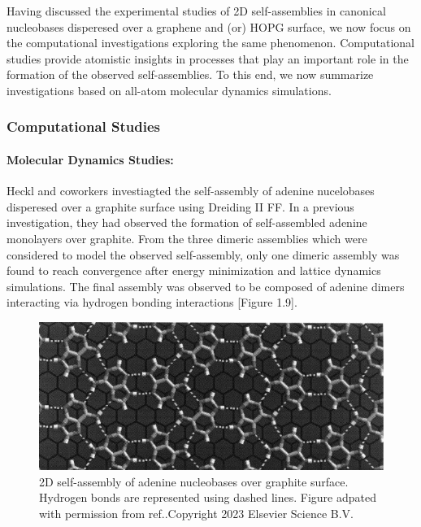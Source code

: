 Having discussed the experimental studies of 2D self-assemblies in canonical nucleobases disperesed over a graphene and (or) HOPG surface, we now focus on the computational investigations exploring the same phenomenon. Computational studies provide atomistic insights in processes that play an important role in the formation of the observed self-assemblies. To this end, we now summarize investigations based on all-atom molecular dynamics simulations.

\subsubsection{Computational Studies}
\paragraph{Molecular Dynamics Studies:} Heckl and coworkers investiagted the self-assembly of adenine nucelobases disperesed over a graphite surface using Dreiding II FF.\supercite{edelwirth_molecular_1998} In a previous investigation, they had observed the formation of self-assembled adenine monolayers over graphite.\supercite{freund_structure_1997} From the three dimeric assemblies which were considered to model the observed self-assembly, only one dimeric assembly was found to reach convergence after energy minimization and lattice dynamics simulations. The final assembly was observed to be composed of adenine dimers interacting via hydrogen bonding interactions [Figure 1.9].
\begin{figure}
    \centering
    \includegraphics{Introduction/Figures/Figure18.png}
    \caption[Representaive image depicting adenine self-assemblies over graphene]{2D self-assembly of adenine nucleobases over graphite surface. Hydrogen bonds are represented using dashed lines. Figure adpated with permission from ref.\supercite{edelwirth_molecular_1998}.Copyright 2023 Elsevier Science B.V.}
    \label{fig:figure9}
\end{figure}

